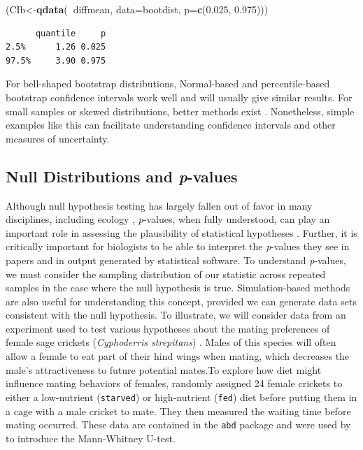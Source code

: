 \documentclass[fleqn,10pt]{wlpeerj} %
\newenvironment{Shaded}{\begin{snugshade}}{\end{snugshade}}
\newcommand{\DataTypeTok}[1]{\textcolor[rgb]{0.13,0.29,0.53}{#1}}
\newcommand{\FloatTok}[1]{\textcolor[rgb]{0.00,0.00,0.81}{#1}}
\newcommand{\KeywordTok}[1]{\textcolor[rgb]{0.13,0.29,0.53}{\textbf{#1}}}
\newcommand{\NormalTok}[1]{#1}
\newcommand{\OperatorTok}[1]{\textcolor[rgb]{0.81,0.36,0.00}{\textbf{#1}}}
\begin{document}
\begin{Shaded}
\begin{Highlighting}[]
\NormalTok{(CIb<-}\KeywordTok{qdata}\NormalTok{(}\OperatorTok{~}\NormalTok{diffmean, }\DataTypeTok{data=}\NormalTok{bootdist, }\DataTypeTok{p=}\KeywordTok{c}\NormalTok{(}\FloatTok{0.025}\NormalTok{, }\FloatTok{0.975}\NormalTok{)))}
\end{Highlighting}
\end{Shaded}

\begin{verbatim}
      quantile     p
2.5%      1.26 0.025
97.5%     3.90 0.975
\end{verbatim}

For bell-shaped bootstrap distributions, Normal-based and percentile-based bootstrap confidence intervals work well and will usually give similar results. For small samples or skewed distributions, better methods exist \citep{davison_hinkley_1997, Hesterberg2015, Puth2015}. Nonetheless, simple examples like this can facilitate understanding confidence intervals and other measures of uncertainty.

\hypertarget{null-distributions-and-p-values}{%
\subsection*{\texorpdfstring{Null Distributions and \emph{p}-values}{Null Distributions and p-values}}\label{null-distributions-and-p-values}}

Although null hypothesis testing has largely fallen out of favor in many disciplines, including ecology \citep{johnson1999, Hobbs2006}, \emph{p}-values, when fully understood, can play an important role in assessing the plausibility of statistical hypotheses \citep{DeValpine2014, Murtaugh2014, Dushoff2019}. Further, it is critically important for biologists to be able to interpret the \emph{p}-values they see in papers and in output generated by statistical software. To understand \emph{p}-values, we must consider the sampling distribution of our statistic across repeated samples in the case where the null hypothesis is true. Simulation-based methods are also useful for understanding this concept, provided we can generate data sets consistent with the null hypothesis. To illustrate, we will consider data from an experiment used to test various hypotheses about the mating preferences of female sage crickets (\emph{Cyphoderris strepitans}) \citep{johnson1999female}. Males of this species will often allow a female to eat part of their hind wings when mating, which decreases the male's attractiveness to future potential mates.To explore how diet might influence mating behaviors of females, \citet{johnson1999female} randomly assigned 24 female crickets to either a low-nutrient (\texttt{starved}) or high-nutrient (\texttt{fed}) diet before putting them in a cage with a male cricket to mate. They then measured the waiting time before mating occurred. These data are contained in the \texttt{abd} package and were used by \citet{whitlock2009analysis} to introduce the Mann-Whitney U-test.
\end{document}
